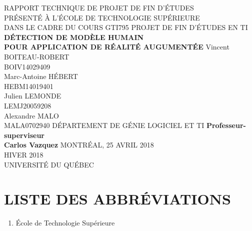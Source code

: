 \documentclass[letterpaper,twoside,12pt,french]{report}
\newcommand{\reportTitle}{\uppercase{Détection de modèle humain\\Pour application de réalité augumentée}}
\newcommand{\reportAuthors}{Vincent \uppercase{Boiteau-Robert\\BOIV14029409}\\Marc-Antoine \uppercase{Hébert\\HEBM14019401}\\Julien \uppercase{Lemonde\\LEMJ20059208}\\Alexandre \uppercase{Malo\\MALA0702940}}
\newcommand{\abbrItem}[2]{\item[\uppercase{\textbf{#1}} -] #2}
\begin{document}
\setlength{\parindent}{0cm}\setlength{\parskip}{2ex minus 0.2ex}
\begin{titlepage}
    \begin{center}
        \uppercase{Rapport technique de projet de fin d'études\\Présenté à l'école de technologie supérieure\\Dans le cadre du cours GTI795 Projet de fin d'études en TI}
        \vfill
        \textbf{\reportTitle}
        \vfill
        \reportAuthors
        \vfill
        \uppercase{Département de génie logiciel et TI}
        \vfill
        \textbf{Professeur-superviseur\\Carlos Vazquez}
        \vfill
        \uppercase{Montréal, 25 avril 2018\\Hiver 2018\\Université du Québec}
    \end{center}
\end{titlepage}
\cleardoublepage
\begin{abstract}
    \begin{center}
        \textbf{\uppercase{\Large{Résumé}}}
        \vspace{2ex}
        \\ \textbf{\reportTitle}
        \\ \vspace{1\baselineskip}
        \reportAuthors
        \\ \vspace{1\baselineskip}
        text résumé ici
    \end{center}
    \vspace{-\baselineskip}
\end{abstract}
\tableofcontents
\listoftables
\listoffigures
\chapter*{\uppercase{Liste des abbréviations}}
\begin{enumerate}
        \abbrItem{ÉTS}{École de Technologie Supérieure}
\end{enumerate}
\cleardoublepage
{}
\end{document}
